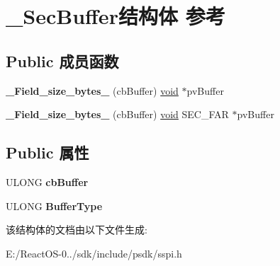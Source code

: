 \hypertarget{struct___sec_buffer}{}\section{\+\_\+\+Sec\+Buffer结构体 参考}
\label{struct___sec_buffer}
\subsection*{Public 成员函数}
\begin{DoxyCompactItemize}
\item 
\mbox{\label{struct___sec_buffer_a44895a7a2774cad914d6a6a33e6f0e24}} 
{\bfseries \+\_\+\+Field\+\_\+size\+\_\+bytes\+\_\+} (cb\+Buffer) \hyperlink{interfacevoid}{void} $\ast$pv\+Buffer
\item 
\mbox{\label{struct___sec_buffer_aae50b854669db99084d35fd865b07fb6}} 
{\bfseries \+\_\+\+Field\+\_\+size\+\_\+bytes\+\_\+} (cb\+Buffer) \hyperlink{interfacevoid}{void} S\+E\+C\+\_\+\+F\+AR $\ast$pv\+Buffer
\end{DoxyCompactItemize}
\subsection*{Public 属性}
\begin{DoxyCompactItemize}
\item 
\mbox{\label{struct___sec_buffer_a696a069d8f881f275e0992c7c4b339f9}} 
U\+L\+O\+NG {\bfseries cb\+Buffer}
\item 
\mbox{\label{struct___sec_buffer_a1bf1de9892b9753149c7d0014f5a5031}} 
U\+L\+O\+NG {\bfseries Buffer\+Type}
\end{DoxyCompactItemize}


该结构体的文档由以下文件生成\+:\begin{DoxyCompactItemize}
\item 
E\+:/\+React\+O\+S-\/0../sdk/include/psdk/sspi.\+h\end{DoxyCompactItemize}
